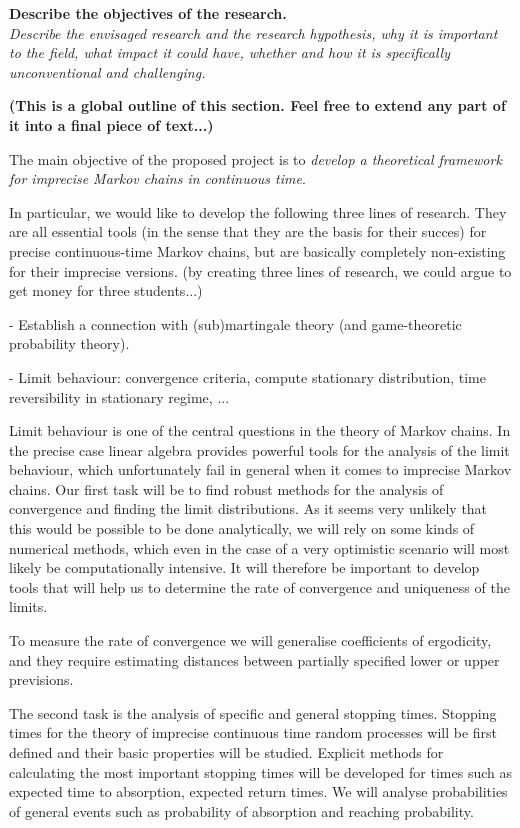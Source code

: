 \documentclass[11pt,dvipsnames,usenames,a4paper]{article}
\begin{document}
\vspace{3mm}

\textbf{Describe the objectives of the research.}\\
\textit{Describe the envisaged research and the research hypothesis, why it is important to the field, what impact it could have, whether and how it is specifically unconventional and challenging.}

{\bf\color{blue} (This is a global outline of this section. Feel free to extend any part of it into a final piece of text...)}


The main objective of the proposed project is to \emph{develop a theoretical framework for imprecise Markov chains in continuous time}.

In particular, we would like to develop the following three lines of research. They are all essential tools (in the sense that they are the basis for their succes) for precise continuous-time Markov chains, but are basically completely non-existing for their imprecise versions. (by creating three lines of research, we could argue to get money for three students...)

- Establish a connection with (sub)martingale theory (and game-theoretic probability theory).

- Limit behaviour: convergence criteria, compute stationary distribution, time reversibility in stationary regime, ...

Limit behaviour is one of the central questions in the theory of Markov chains. In the precise case linear algebra provides powerful tools for the analysis of the limit behaviour, which unfortunately fail in general when it comes to imprecise Markov chains. 
Our first task will be to find robust methods for the analysis of convergence and finding the limit distributions. 
As it seems very unlikely that this would be possible to be done analytically, we will rely on some kinds of numerical methods, which even in the case of a very optimistic scenario will most likely be computationally intensive. 
It will therefore be important to develop tools that will help us to determine the rate of convergence and uniqueness of the limits. 

To measure the rate of convergence we will generalise coefficients of ergodicity, and they require estimating distances between partially specified lower or upper previsions. 

The second task is the analysis of specific and general stopping times. 
Stopping times for the theory of imprecise continuous time random processes will be first defined and their basic properties will be studied. 
Explicit methods for calculating the most important stopping times will be developed for times such as expected time to absorption, expected return times. 
We will analyse probabilities of general events such as probability of absorption and reaching probability.  
\end{document}
